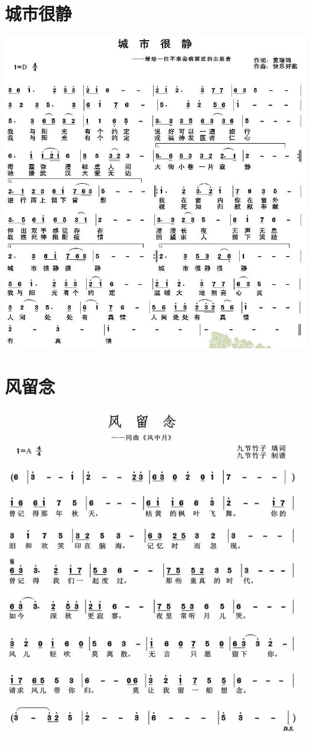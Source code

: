 \documentclass[cn,pad,chinese]{elegantbook}
\begin{document}
\section{城市很静}
    \includegraphics[width=\textwidth]{dongxiao/20200402-城市很静} 
\section{风留念}
    \includegraphics[width=\textwidth]{dongxiao/20200323风留念.jpg}
\end{document}
